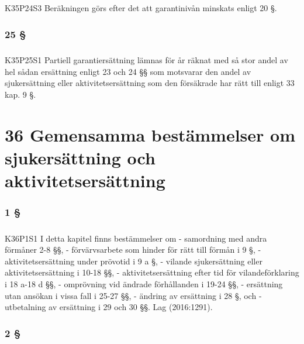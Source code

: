 \documentclass[a4paper,notitlepage,openany,10pt]{book}
\begin{document}
\paragraph*{}
{\tiny K35P24S3}
Beräkningen görs efter det att garantinivån minskats enligt 20 §.
\subsection*{25 §}
\paragraph*{}
{\tiny K35P25S1}
Partiell garantiersättning lämnas för år räknat med så stor andel av hel sådan ersättning enligt 23 och 24 §§ som motsvarar den andel av sjukersättning eller aktivitetsersättning som den försäkrade har rätt till enligt 33 kap. 9 §.
\chapter*{36 Gemensamma bestämmelser om sjukersättning och aktivitetsersättning}
\subsection*{1 §}
\paragraph*{}
{\tiny K36P1S1}
I detta kapitel finns bestämmelser om
\newline - samordning med andra förmåner 2-8 §§,
\newline - förvärvsarbete som hinder för rätt till förmån i 9 §,
\newline - aktivitetsersättning under prövotid i 9 a §,
\newline - vilande sjukersättning eller aktivitetsersättning i 10-18 §§,
\newline - aktivitetsersättning efter tid för vilandeförklaring i 18 a-18 d §§,
\newline - omprövning vid ändrade förhållanden i 19-24 §§,
\newline - ersättning utan ansökan i vissa fall i 25-27 §§,
\newline - ändring av ersättning i 28 §, och
\newline - utbetalning av ersättning i 29 och 30 §§.
Lag (2016:1291).
\subsection*{2 §}
\end{document}

